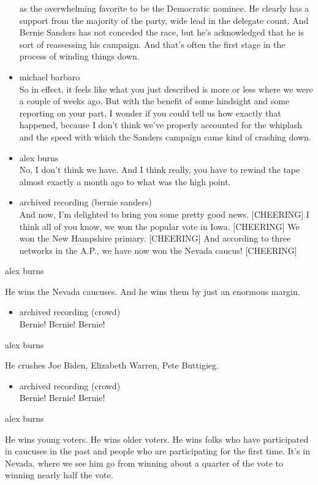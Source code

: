 \begin{itemize}
  as the overwhelming favorite to be the Democratic nominee. He clearly
  has a support from the majority of the party, wide lead in the
  delegate count. And Bernie Sanders has not conceded the race, but he's
  acknowledged that he is sort of reassessing his campaign. And that's
  often the first stage in the process of winding things down.
\item
  michael barbaro\\
  So in effect, it feels like what you just described is more or less
  where we were a couple of weeks ago. But with the benefit of some
  hindsight and some reporting on your part, I wonder if you could tell
  us how exactly that happened, because I don't think we've properly
  accounted for the whiplash and the speed with which the Sanders
  campaign came kind of crashing down.
\item
  alex burns\\
  No, I don't think we have. And I think really, you have to rewind the
  tape almost exactly a month ago to what was the high point.
\item
  archived recording (bernie sanders)\\
  And now, I'm delighted to bring you some pretty good news.
  {[}CHEERING{]} I think all of you know, we won the popular vote in
  Iowa. {[}CHEERING{]} We won the New Hampshire primary. {[}CHEERING{]}
  And according to three networks in the A.P., we have now won the
  Nevada caucus! {[}CHEERING{]}
\end{itemize}

alex burns

He wins the Nevada caucuses. And he wins them by just an enormous
margin.

\begin{itemize}
\tightlist
\item
  archived recording (crowd)\\
  Bernie! Bernie! Bernie!
\end{itemize}

alex burns

He crushes Joe Biden, Elizabeth Warren, Pete Buttigieg.

\begin{itemize}
\tightlist
\item
  archived recording (crowd)\\
  Bernie! Bernie! Bernie!
\end{itemize}

alex burns

He wins young voters. He wins older voters. He wins folks who have
participated in caucuses in the past and people who are participating
for the first time. It's in Nevada, where we see him go from winning
about a quarter of the vote to winning nearly half the vote.

